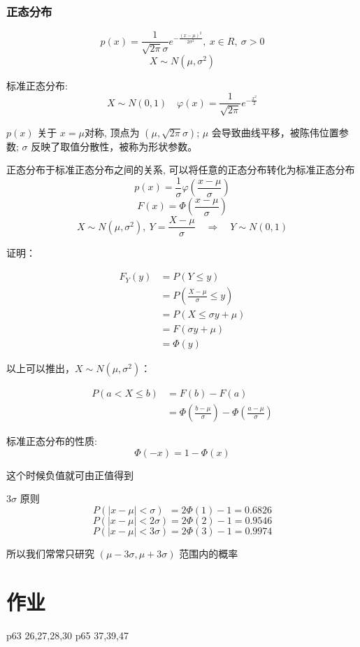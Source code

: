 \documentclass[10pt, a4paper]{article}
\begin{document}
        \subsubsection{正态分布}
        $$p(x) = \frac{1}{\sqrt{2\pi}\sigma}e^{-\frac{(x - \mu)^2}{2\sigma^2}},\ x \in R,\ \sigma > 0 $$
        $$X \sim N(\mu, \sigma^2)$$

        标准正态分布:
        $$X\sim N(0,1) \quad \varphi(x) = \frac{1}{\sqrt{2\pi}}e^{-\frac{x^2}{2}}$$

        $p(x)$ 关于 $x = \mu$对称, 顶点为 $(\mu, \sqrt{2\pi}\sigma)$; $\mu$ 会导致曲线平移，被陈伟位置参数; $\sigma$ 反映了取值分散性，被称为形状参数。
        
        正态分布于标准正态分布之间的关系, 可以将任意的正态分布转化为标准正态分布
        $$p(x) = \frac{1}{\sigma}\varphi(\frac{x - \mu}{\sigma})$$
        $$F(x) = \Phi(\frac{x - \mu}{\sigma})$$
        $$X \sim N(\mu, \sigma^2),\ Y = \frac{X - \mu}{\sigma} \quad \Rightarrow \quad Y \sim N(0, 1)$$

        证明：

        $$\begin{aligned} 
            F_Y(y)
            &= P(Y \leqslant y) \\
            &= P(\frac{X - \mu}{\sigma} \leqslant y) \\
            &= P(X \leqslant \sigma y + \mu) \\
            &= F(\sigma y + \mu) \\ 
            &= \Phi (y)
        \end{aligned} $$
        
        以上可以推出，$X \sim N(\mu, \sigma^2)$：

        $$\begin{aligned} 
            P(a < X \leqslant b) 
            &= F(b) - F(a) \\ 
            &= \Phi(\frac{b - \mu}{\sigma}) - \Phi(\frac{a - \mu}{\sigma})
        \end{aligned}$$

        标准正态分布的性质:
        $$\Phi(-x) = 1 - \Phi(x)$$
        
        这个时候负值就可由正值得到

        $3\sigma$ 原则
        $$P(|x - \mu| < \sigma)\ \ = 2\Phi(1) - 1 =  0.6826$$
        $$P(|x - \mu| < 2\sigma) = 2\Phi(2) - 1 = 0.9546$$
        $$P(|x - \mu| < 3\sigma) = 2\Phi(3) - 1 = 0.9974$$

        所以我们常常只研究 $(\mu - 3\sigma, \mu + 3\sigma)$ 范围内的概率

\section{作业}
p63 26,27,28,30 p65 37,39,47
        
\end{document}
